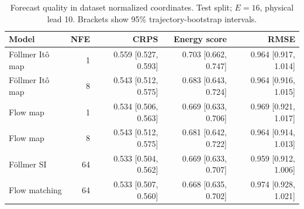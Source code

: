 \begin{table}[t]
\centering
\small
\setlength{\tabcolsep}{3pt}
\caption{Forecast quality in dataset normalized coordinates. Test split; $E=16$, physical lead 10. Brackets show 95\% trajectory-bootstrap intervals.}
\label{tab:map-quality}
\begin{tabular}{lrrrr}
\toprule
Model & NFE & CRPS & Energy score & RMSE \\
\midrule
Föllmer Itô map & 1 & 0.559 [0.527, 0.593] & 0.703 [0.662, 0.747] & 0.964 [0.917, 1.014] \\
Föllmer Itô map & 8 & 0.543 [0.512, 0.575] & 0.683 [0.643, 0.724] & 0.964 [0.916, 1.015] \\
\addlinespace
Flow map & 1 & 0.534 [0.506, 0.563] & 0.669 [0.633, 0.706] & 0.969 [0.921, 1.017] \\
Flow map & 8 & 0.543 [0.512, 0.575] & 0.681 [0.642, 0.722] & 0.964 [0.914, 1.013] \\
\addlinespace
Föllmer SI & 64 & 0.533 [0.504, 0.562] & 0.669 [0.633, 0.707] & 0.959 [0.912, 1.006] \\
\addlinespace
Flow matching & 64 & 0.533 [0.507, 0.560] & 0.668 [0.635, 0.702] & 0.974 [0.928, 1.021] \\
\bottomrule
\end{tabular}
\end{table}
